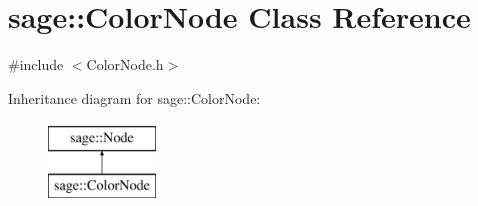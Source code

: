 \hypertarget{classsage_1_1ColorNode}{}\section{sage\+::Color\+Node Class Reference}
\label{classsage_1_1ColorNode}


{\ttfamily \#include $<$Color\+Node.\+h$>$}

Inheritance diagram for sage\+::Color\+Node\+:\begin{figure}[H]
\begin{center}
\leavevmode
\includegraphics[height=2.000000cm]{classsage_1_1ColorNode}
\end{center}
\end{figure}
